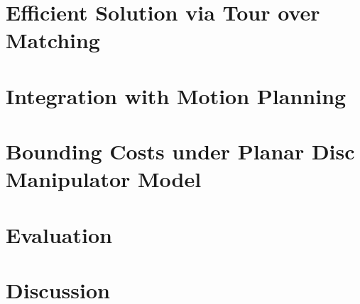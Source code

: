 \documentclass{llncs}
\begin{document}
\section{Efficient Solution via Tour over Matching}
\label{sec:approximation}


\section{Integration with Motion Planning}
\label{sec:integration}


\section{Bounding Costs under Planar Disc Manipulator Model}
\label{sec:cost_bounds}


\section{Evaluation}
\label{sec:evaluation}


\section{Discussion}
\label{sec:discussion}


%
{\small

}


%
\end{document}
